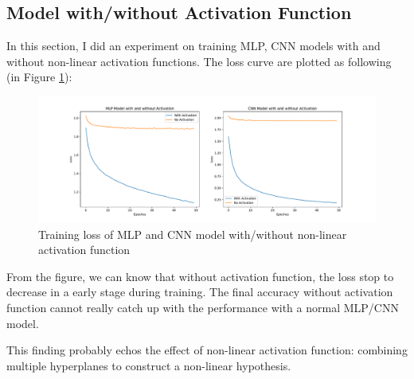 \documentclass[12pt,letterpaper]{article}
\begin{document}
\subsection*{Model with/without Activation Function}
In this section, I did an experiment on training MLP, CNN models with and without non-linear activation functions. The loss curve are plotted as following (in Figure \ref{fig:activation}):

\begin{figure}[h]
  \centering
  \includegraphics[width=\textwidth]{Activation_NO_Activation.pdf}
  \caption[]{Training loss of MLP and CNN model with/without non-linear activation function}
  \label{fig:activation}
\end{figure}

From the figure, we can know that without activation function, the loss stop to decrease in a early stage during training. The final accuracy without activation function cannot really catch up with the performance with a normal MLP/CNN model.

This finding probably echos the effect of non-linear activation function: combining multiple hyperplanes to construct a non-linear hypothesis.
\end{document}
